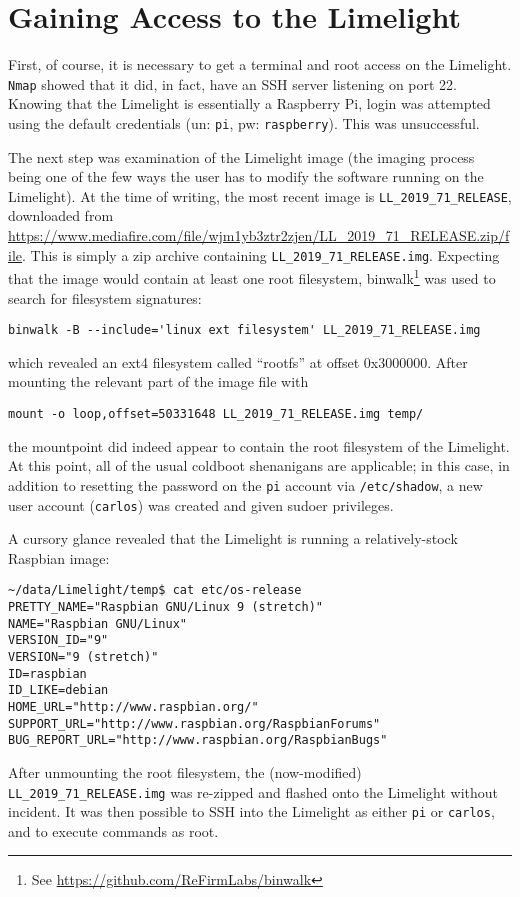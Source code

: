 \documentclass{article}
\begin{document}
\section{Gaining Access to the Limelight}
\par First, of course, it is necessary to get a terminal and root access on the Limelight. \texttt{Nmap} showed that it did, in fact, have an SSH server listening on port 22. Knowing that the Limelight is essentially a Raspberry Pi, login was attempted using the default credentials (un: \texttt{pi}, pw: \texttt{raspberry}). This was unsuccessful.
\par The next step was examination of the Limelight image (the imaging process being one of the few ways the user has to modify the software running on the Limelight). At the time of writing, the most recent image is \texttt{LL\_2019\_71\_RELEASE}, downloaded from \url{https://www.mediafire.com/file/wjm1yb3ztr2zjen/LL\_2019\_71\_RELEASE.zip/file}. This is simply a zip archive containing \texttt{LL\_2019\_71\_RELEASE.img}. Expecting that the image would contain at least one root filesystem, binwalk\footnote{See \url{https://github.com/ReFirmLabs/binwalk}} was used to search for filesystem signatures: 
\begin{verbatim}
binwalk -B --include='linux ext filesystem' LL_2019_71_RELEASE.img
\end{verbatim}
which revealed an ext4 filesystem called ``rootfs'' at offset 0x3000000. After mounting the relevant part of the image file with 
\begin{verbatim}
mount -o loop,offset=50331648 LL_2019_71_RELEASE.img temp/
\end{verbatim}
the mountpoint did indeed appear to contain the root filesystem of the Limelight. At this point, all of the usual coldboot shenanigans are applicable; in this case, in addition to resetting the password on the \texttt{pi} account via \texttt{/etc/shadow}, a new user account (\texttt{carlos}) was created and given sudoer privileges. 
\par A cursory glance revealed that the Limelight is running a relatively-stock Raspbian image:
\begin{verbatim}
~/data/Limelight/temp$ cat etc/os-release
PRETTY_NAME="Raspbian GNU/Linux 9 (stretch)"
NAME="Raspbian GNU/Linux"
VERSION_ID="9"
VERSION="9 (stretch)"
ID=raspbian
ID_LIKE=debian
HOME_URL="http://www.raspbian.org/"
SUPPORT_URL="http://www.raspbian.org/RaspbianForums"
BUG_REPORT_URL="http://www.raspbian.org/RaspbianBugs"
\end{verbatim}
\par After unmounting the root filesystem, the (now-modified) \texttt{LL\_2019\_71\_RELEASE.img} was re-zipped and flashed onto the Limelight without incident. It was then possible to SSH into the Limelight as either \texttt{pi} or \texttt{carlos}, and to execute commands as root. 
\end{document}

